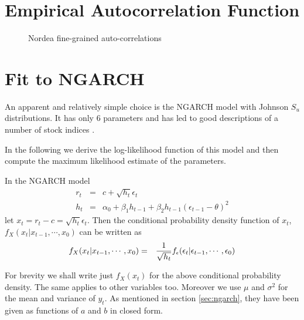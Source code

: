 \documentclass{book}
\begin{document}
\section{Empirical Autocorrelation Function}
\begin{figure}[ht]
  \centering
  \caption{Nordea fine-grained auto-correlations}
  \label{fig:Nordea-fine-autocorr}
\end{figure}


\section{Fit to NGARCH}
An apparent and relatively simple choice is the NGARCH model with
Johnson $S_u$ distributions. It has only 6 parameters and has led to
good descriptions of a number of stock indices \cite{Simonato2012}.

In the following we derive the log-likelihood function of this
model and then compute the maximum likelihood estimate of the
parameters.

In the NGARCH model
\begin{eqnarray*}
  r_t &=& c + \sqrt{h_t} \epsilon_t \\
  h_t &=& \alpha_0 + \beta_1 h_{t-1} + \beta_2
  h_{t-1}(\epsilon_{t-1} - \theta)^2
\end{eqnarray*}
let $x_t = r_t - c = \sqrt{h_t} \epsilon_t$. Then the conditional
probability density function of $x_t$, $f_X(x_t | x_{t-1}, \cdots,
x_0)$ can be written as
\begin{eqnarray*}
  f_X(x_t | x_{t-1}, \cdots, x_0) &=& {1 \over \sqrt{h_t}}
  f_\epsilon(\epsilon_t | \epsilon_{t-1}, \cdots, \epsilon_0)
\end{eqnarray*}

For brevity we shall write just $f_X(x_t)$ for the above conditional
probability density. The same applies to other variables too. Moreover
we use $\mu$ and $\sigma^2$ for the mean and variance of $y_t$. As
mentioned in section \ref{sec:ngarch}, they have been given as
functions of $a$ and $b$ in closed form.
\end{document}
